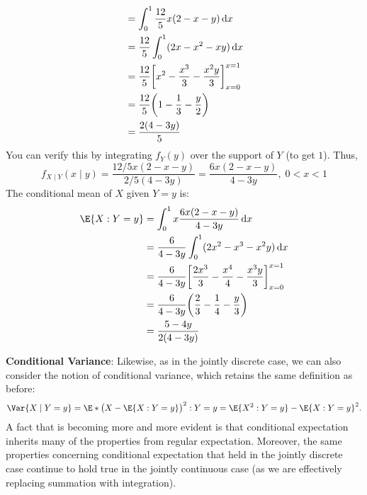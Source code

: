 \begin{Example}
\begin{align*}
         & =\int_{0}^{1}\frac{12}{5} x(2-x-y)\odif{x}                                 \\
         & =\frac{12}{5} \int_{0}^{1}(2x-x^2-xy)\odif{x}                              \\
         & =\frac{12}{5} \biggl[x^2-\frac{x^3}{3} -\frac{x^2y}{3} \biggr]_{x=0}^{x=1} \\
         & =\frac{12}{5} \biggl(1-\frac{1}{3} -\frac{y}{2} \biggr)                    \\
         & =\frac{2(4-3y)}{5}
    \end{align*}
    You can verify this by integrating $ f_Y(y) $ over the support of $ Y $ (to get $1$). Thus,
    \[ f_{X\mid Y}(x\mid y)=\frac{12/5 x(2-x-y)}{2/5 (4-3y)}=\frac{6x(2-x-y)}{4-3y},\; 0<x<1 \]
    The conditional mean of $ X $ given $ Y=y $ is:
    \begin{align*}
        \E{X\given Y=y}
         & =\int_{0}^{1}x \frac{6x(2-x-y)}{4-3y} \odif{x}                                           \\
         & =\frac{6}{4-3y} \int_{0}^{1}(2x^2-x^3-x^2y)\odif{x}                                      \\
         & =\frac{6}{4-3y} \biggl[\frac{2x^3}{3} -\frac{x^4}{4} -\frac{x^3 y}{3}\biggr]_{x=0}^{x=1} \\
         & =\frac{6}{4-3y} \biggl(\frac{2}{3}-\frac{1}{4}-\frac{y}{3} \biggr)                       \\
         & =\frac{5-4y}{2(4-3y)}
    \end{align*}
\end{Example}
\begin{Regular}
    \textbf{Conditional Variance}: Likewise, as in the jointly discrete case, we can also consider the notion of
    conditional variance, which retains the same definition as before:
    \[ \Var{X\mid Y=y}=\E*{\bigl(X-\E{X\given Y=y}\bigr)^2\given Y=y}=\E{X^2\given Y=y}-\E{X\given Y=y}^2. \]
    A fact that is becoming more and more evident is that conditional expectation inherits many
    of the properties from regular expectation. Moreover, the same properties concerning
    conditional expectation that held in the jointly discrete case continue to hold true in the
    jointly continuous case (as we are effectively replacing summation with integration).
\end{Regular}
